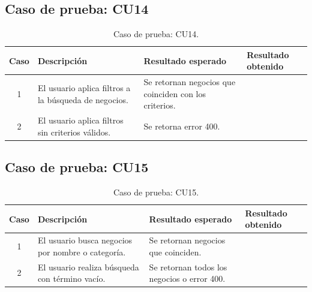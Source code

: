 
\subsection{Caso de prueba: CU14}

\begin{table}[H]
\centering
\label{tab:cu14_white_test}
\renewcommand{\arraystretch}{1.3}
\begin{tabular}{|c|p{5cm}|p{6cm}|p{2.5cm}|}
\hline
\rowcolor[RGB]{217,217,217}
\textbf{Caso} & \textbf{Descripción} & \textbf{Resultado esperado} & \textbf{Resultado obtenido} \\
\hline

1 &
El usuario aplica filtros a la búsqueda de negocios. &
Se retornan negocios que coinciden con los criterios. &
 \\
\hline

2 &
El usuario aplica filtros sin criterios válidos. &
Se retorna error 400. &
 \\
\hline

\end{tabular}
\caption{Caso de prueba: CU14.}
\end{table}


\subsection{Caso de prueba: CU15}

\begin{table}[H]
\centering
\label{tab:cu15_white_test}
\renewcommand{\arraystretch}{1.3}
\begin{tabular}{|c|p{5cm}|p{6cm}|p{2.5cm}|}
\hline
\rowcolor[RGB]{217,217,217}
\textbf{Caso} & \textbf{Descripción} & \textbf{Resultado esperado} & \textbf{Resultado obtenido} \\
\hline

1 &
El usuario busca negocios por nombre o categoría. &
Se retornan negocios que coinciden. &
 \\
\hline

2 &
El usuario realiza búsqueda con término vacío. &
Se retornan todos los negocios o error 400. &
 \\
\hline

\end{tabular}
\caption{Caso de prueba: CU15.}
\end{table}


